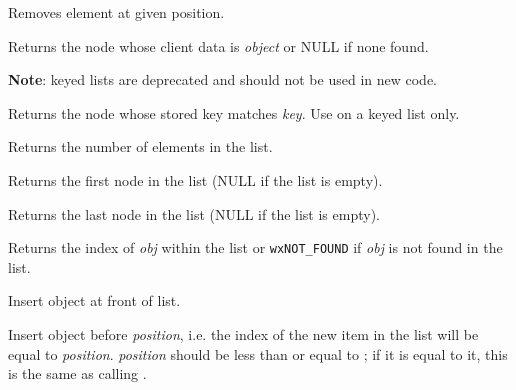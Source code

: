 \label{wxlisterase}


Removes element at given position.

\label{wxlistfind}


Returns the node whose client data is {\it object} or NULL if none found.

{\bf Note}: keyed lists are deprecated and should not be used in new code.



Returns the node whose stored key matches {\it key}. Use on a keyed list only.

\label{wxlistgetcount}


Returns the number of elements in the list.

\label{wxlistgetfirst}


Returns the first node in the list (NULL if the list is empty).

\label{wxlistgetlast}


Returns the last node in the list (NULL if the list is empty).

\label{wxlistindexof}


Returns the index of {\it obj} within the list or {\tt wxNOT\_FOUND} if {\it obj}
is not found in the list.

\label{wxlistinsert}


Insert object at front of list.


Insert object before {\it position}, i.e. the index of the new item in the
list will be equal to {\it position}. {\it position} should be less than or
equal to ; if it is equal to it, this is the
same as calling .

